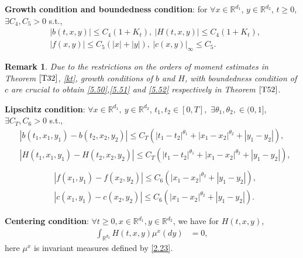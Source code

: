 \documentclass[11pt,reqno]{amsart}
\newtheorem{remark}{\indent Remark}[section]
\numberwithin{equation}{section}
\begin{document}
\noindent\textbf{Growth condition and boundedness condition}: for
$\forall x\in \mathbb{R}^{d_{1}}$, $y\in \mathbb{R}^{d_{2}}$,  $t\geq0$, $\exists C_{4},C_{5}>0$ s.t.,
\begin{equation}\label{2.77}
	\begin{split}	
		&|b(t,x,y)| \leq C_{4}(1+K_{t}),\  |H(t,x,y)| \leq C_{4}(1+K_{t}),\\
		&  |f(x,y)| \leq C_{5}(|x|+|y|),\ |c(x,y)|_{\infty} \leq C_{5}.
	\end{split}
\end{equation}
\begin{remark}
Due to the restrictions on the orders of moment estimates in Theorem $\ref{T32}$, \eqref{kt}, growth conditions of $b$ and $H$, with boundedness condition of $c$ are crucial to obtain \eqref{5.50},\eqref{5.51} and \eqref{5.52} respectively in Theorem $\ref{T52}$.
\end{remark}



\noindent\textbf{Lipschitz condition}: $\forall x\in \mathbb{R}^{d_{1}},\ y\in \mathbb{R}^{d_{2}}$, $t_{1},t_{2}\in [0,T],$ $\exists \theta_{1},\theta_{2},\in (0,1]$, $\exists C_{T},C_{6}>0$ s.t.,
\begin{equation}\label{2.111}
	\begin{split}
		&|b(t_{1},x_{1},y_{1})-b(t_{2},x_{2},y_{2})| \leq C_{T}(|t_{1}-t_{2}|^{\theta_{1}}+|x_{1}-x_{2}|^{\theta_{2}}+|y_{1}-y_{2}|),\\		&|H(t_{1},x_{1},y_{1})-H(t_{2},x_{2},y_{2})| \leq C_{T}(|t_{1}-t_{2}|^{\theta_{1}}+|x_{1}-x_{2}|^{\theta_{2}}+|y_{1}-y_{2}|),\\
	\end{split}
\end{equation}
\begin{equation}\label{2.112}
	\begin{split}
			&|f(x_{1},y_{1})-f(x_{2},y_{2})| \leq C_{6}(|x_{1}-x_{2}|^{\theta_{2}}+|y_{1}-y_{2}|),\\
			&|c(x_{1},y_{1})-c(x_{2},y_{2})| \leq C_{6}(|x_{1}-x_{2}|^{\theta_{2}}+|y_{1}-y_{2}|).
	\end{split}
\end{equation}

\noindent\textbf{Centering condition}: $\forall t\geq0, x\in \mathbb{R}^{d_{1}}, y\in \mathbb{R}^{d_{2}}$, we have for  $H(t,x,y)$,
\begin{equation}\label{2.13}
	\begin{split}
		\int_{\mathbb{R}^{ d_{2}}}H(t,x,y)\mu^{x}(dy)&=0,
	\end{split}
\end{equation}
here $\mu^{x}$ is invariant measures defined by \eqref{2.23}.
\end{document}

